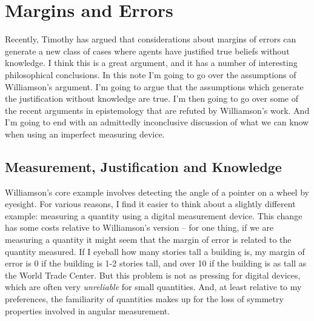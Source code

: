 \chapter[Margins and Errors]{Margins and Errors}




Recently, Timothy \citet{WilliamsonLofoten} has argued that considerations about margins of errors can generate a new class of cases where agents have justified true beliefs without knowledge. I think this is a great argument, and it has a number of interesting philosophical conclusions. In this note I'm going to go over the assumptions of Williamson's argument. I'm going to argue that the assumptions which generate the justification without knowledge are true. I'm then going to go over some of the recent arguments in epistemology that are refuted by Williamson's work. And I'm going to end with an admittedly inconclusive discussion of what we can know when using an imperfect measuring device.

\section{Measurement, Justification and Knowledge}

Williamson's core example involves detecting the angle of a pointer on a wheel by eyesight. For various reasons, I find it easier to think about a slightly different example: measuring a quantity using a digital measurement device. This change has some costs relative to Williamson's version -- for one thing, if we are measuring a quantity it might seem that the margin of error is related to the quantity measured. If I eyeball how many stories tall a building is, my margin of error is 0 if the building is 1-2 stories tall, and over 10 if the building is as tall as the World Trade Center. But this problem is not as pressing for digital devices, which are often very \textit{unreliable} for small quantities. And, at least relative to my preferences, the familiarity of quantities makes up for the loss of symmetry properties involved in angular measurement.

